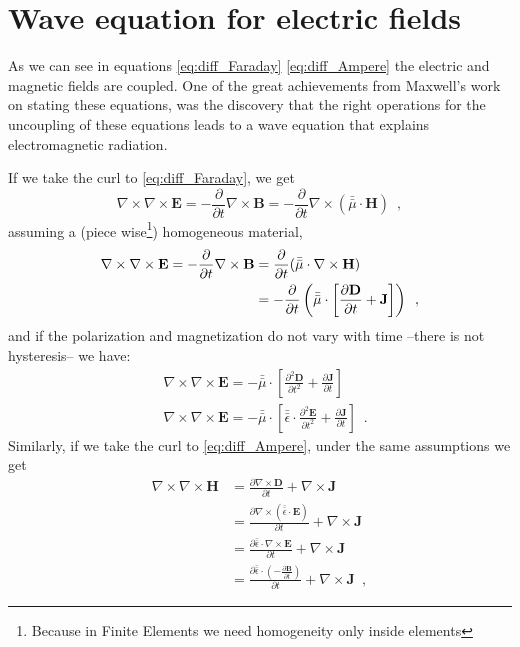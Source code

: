 \section{Wave equation for electric fields}

As we can see in equations \ref{eq:diff_Faraday} \ref{eq:diff_Ampere} the electric and magnetic fields are coupled. One of the great achievements from Maxwell's work on stating these equations, was the discovery that the right operations for the uncoupling of these equations leads to a wave equation that explains electromagnetic radiation.

If we take the curl to \eqref{eq:diff_Faraday}, we get
\[ \nabla\times\nabla\times\mathbf{E} = -\frac{\partial}{\partial t} \nabla\times \mathbf{B} = -\frac{\partial}{\partial t} \nabla\times (\bar{\bar{\mu}} \cdot \mathbf{H}) \enspace , \]
assuming a (piece wise\footnote{Because in Finite Elements we need homogeneity only inside elements}) homogeneous material,
\begin{align*}
\nabla\times\nabla\times \mathbf{E} = - \frac{\partial}{\partial t} \nabla\times \mathbf{B} &= \- \frac{\partial}{\partial t} ( \bar{\bar{\mu}}\cdot \nabla\times \mathbf{H})\\
&= -\frac{\partial}{\partial t} \left( \bar{\bar{\mu}}\cdot \left[ \frac{\partial \mathbf{D}}{\partial t} + \mathbf{J}\right] \right)\enspace ,
\end{align*}
and if the polarization and magnetization do not vary with time --there is not hysteresis-- we have:
\begin{align}
&\nabla\times\nabla\times \mathbf{E} = -\bar{\bar{\mu}}\cdot \left[ \frac{\partial^2 \mathbf{D}}{\partial t^2} + \frac{\partial \mathbf{J}}{\partial t} \right] \nonumber \\
&\nabla\times\nabla\times \mathbf{E} = -\bar{\bar{\mu}}\cdot \left[ \bar{\bar{\epsilon}}\cdot\frac{\partial^2 \mathbf{E}}{\partial t^2} + \frac{\partial \mathbf{J}}{\partial t} \right] \label{eq:E-wave-loads} \enspace .
\end{align}
Similarly, if we take the curl to \eqref{eq:diff_Ampere}, under the same assumptions we get
\begin{align*}
\nabla\times\nabla\times \mathbf{H} &= \frac{\partial \nabla\times \mathbf{D}}{\partial t} + \nabla\times \mathbf{J}\\
&= \frac{\partial \nabla\times (\bar{\bar{\epsilon}}\cdot\mathbf{E})}{\partial t} + \nabla\times \mathbf{J}\\
&= \frac{\partial  \bar{\bar{\epsilon}}\cdot\nabla\times\mathbf{E}}{\partial t} + \nabla\times \mathbf{J}\\
&= \frac{\partial  \bar{\bar{\epsilon}}\cdot\left(-\frac{\partial \mathbf{B}}{\partial t}\right)}{\partial t} + \nabla\times \mathbf{J} \enspace ,
\end{align*}
